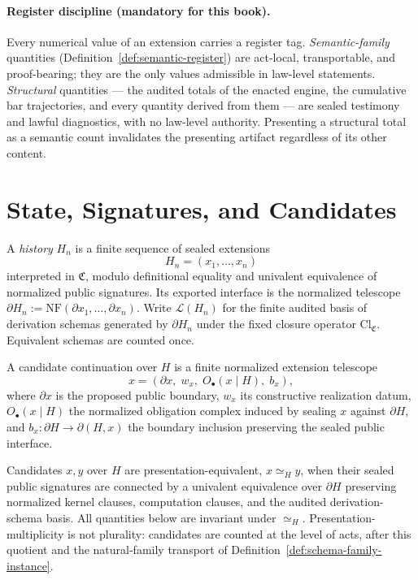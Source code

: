 \paragraph{Register discipline (mandatory for this book).}
Every numerical value of an extension carries a register tag.
\emph{Semantic-family} quantities (Definition~\ref{def:semantic-register})
are act-local, transportable, and proof-bearing; they are the only values
admissible in law-level statements. \emph{Structural} quantities --- the
audited totals of the enacted engine, the cumulative bar trajectories, and
every quantity derived from them --- are sealed testimony and lawful
diagnostics, with no law-level authority. Presenting a structural total as a
semantic count invalidates the presenting artifact regardless of its other
content.

\section{State, Signatures, and Candidates}

\begin{definition}
A \emph{history} \(H_n\) is a finite sequence of sealed extensions
\[
H_n = (x_1,\dots,x_n)
\]
interpreted in \(\mathfrak{C}\), modulo definitional equality and univalent
equivalence of normalized public signatures. Its exported interface is the
normalized telescope
\(\partial H_n := \mathrm{NF}(\partial x_1,\dots,\partial x_n)\).
Write \(\mathcal{L}(H_n)\) for the finite audited basis of derivation schemas
generated by \(\partial H_n\) under the fixed closure operator
\(\mathrm{Cl}_{\mathfrak{C}}\). Equivalent schemas are counted once.
\end{definition}

\begin{definition}
A candidate continuation over \(H\) is a finite normalized extension telescope
\[
x = (\partial x,\; w_x,\; O_\bullet(x\mid H),\; b_x),
\]
where \(\partial x\) is the proposed public boundary, \(w_x\) its constructive
realization datum, \(O_\bullet(x\mid H)\) the normalized obligation complex
induced by sealing \(x\) against \(\partial H\), and
\(b_x : \partial H \to \partial(H,x)\) the boundary inclusion preserving the
sealed public interface.
\end{definition}

\begin{definition}
Candidates \(x,y\) over \(H\) are presentation-equivalent, \(x \simeq_H y\),
when their sealed public signatures are connected by a univalent equivalence
over \(\partial H\) preserving normalized kernel clauses, computation clauses,
and the audited derivation-schema basis. All quantities below are invariant
under \(\simeq_H\). Presentation-multiplicity is not plurality: candidates are
counted at the level of acts, after this quotient and the natural-family
transport of Definition~\ref{def:schema-family-instance}.
\end{definition}

